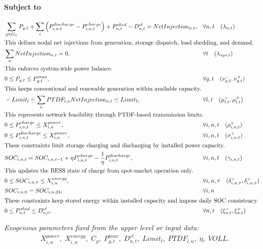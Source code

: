 \documentclass[11pt,a4paper,fleqn]{article}
\begin{document}
\paragraph{Subject to}
\begin{align*}
&\sum_{g \in G_n} P_{g,t}
  + \sum_i \left(P^{discharge}_{i,n,t} - P^{charge}_{i,n,t}\right)
  + P^{shed}_{n,t}
  - D^{el}_{n,t}
  = NetInjection_{n,t},
  &&\forall n,t
  \quad (\lambda_{n,t})
\\
\intertext{This defines nodal net injections from generation, storage dispatch, load shedding, and demand.}
&\sum_n NetInjection_{n,t}=0,
  &&\forall t
  \quad (\lambda_{sys,t})
\\
\intertext{This enforces system-wide power balance.}
&0 \le P_{g,t} \le P^{max}_{g,t},
  &&\forall g,t
  \quad (\nu^-_{g,t},\nu^+_{g,t})
\\
\intertext{This keeps conventional and renewable generation within available capacity.}
&-Limit_l
  \le
  \sum_n PTDF_{l,n} NetInjection_{n,t}
  \le
  Limit_l,
  &&\forall l,t
  \quad (\mu^-_{l,t},\mu^+_{l,t})
\\
\intertext{This represents network feasibility through PTDF-based transmission limits.}
&0 \le P^{charge}_{i,n,t} \le X^{power}_{i,n},
  &&\forall i,n,t
  \quad (\rho^+_{i,n,t})
\\
&0 \le P^{discharge}_{i,n,t} \le X^{power}_{i,n},
  &&\forall i,n,t
  \quad (\sigma^+_{i,n,t})
\\
\intertext{These constraints limit storage charging and discharging by installed power capacity.}
&SOC_{i,n,t}
  =
  SOC_{i,n,t-1}
  + \eta P^{charge}_{i,n,t}
  - \frac{1}{\eta} P^{discharge}_{i,n,t},
  &&\forall i,n,t
  \quad (\gamma_{i,n,t})
\\
\intertext{This updates the BESS state of charge from spot-market operation only.}
&0 \le SOC_{i,n,\tau} \le X^{energy}_{i,n},
  &&\forall i,n,\tau
  \quad (\delta^-_{i,n,\tau},\delta^+_{i,n,\tau})
\\
&SOC_{i,n,0}=SOC_{i,n,24},
  &&\forall i,n
\\
\intertext{These constraints keep stored energy within installed capacity and impose daily SOC consistency.}
&0 \le P^{shed}_{n,t} \le D^{el}_{n,t},
  &&\forall n,t
  \quad (\xi^-_{n,t},\xi^+_{n,t})
\end{align*}

\bigskip
\noindent\textit{Exogenous parameters fixed from the upper level or input data:}
\begin{align*}
&X^{power}_{i,n},\; X^{energy}_{i,n},\; C_g,\; P^{max}_{g,t},\;
D^{el}_{n,t},\; Limit_l,\; PTDF_{l,n},\; \eta,\; VOLL.
\end{align*}
\end{document}
